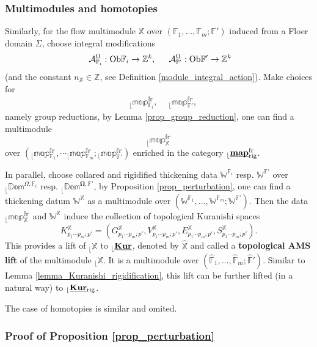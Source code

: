 \documentclass[reqno, 10pt]{amsart}
\numberwithin{equation}{section}
\numberwithin{equation}{section}
\theoremstyle{definition}
\theoremstyle{remark}
\newcommand{\beqn}{\begin{equation*}}
\newcommand{\eeqn}{\end{equation*}}
\newcommand{\mb}{\mathbb}
\newcommand{\mc}{\mathcal}
\renewcommand{\outer}{{}_{\lfloor}}
\newcommand{\wh}{\widehat}
\newcommand{\uds}[1]{\underline{\smash{#1}}}
\begin{document}
\subsubsection{Multimodules and homotopies}

Similarly, for the flow multimodule ${\mb X}$ over $({\mb F}_1, \ldots, {\mb F}_m; {\mb F}')$ induced from a Floer domain $\Sigma$, choose integral modifications 
\begin{align*}
&\ {\mc A}_{{\mb F}_i}^\Omega: {\rm Ob}{\mb F}_i \to {\mb Z}^k,\ &\ {\mc A}_{{\mb F}'}^\Omega: {\rm Ob}{\mb F}' \to {\mb Z}^k
\end{align*}
(and the constant $n_{\mb X}\in {\mb Z}$, see Definition \ref{module_integral_action}). Make choices for 
\begin{align*}
&\ \outer {\mb{map}}{}_{{\mb F}_i}^{\mb{fr}},\ &\ \outer {\mb{map}}{}_{{\mb{F}'}}^{\mb{fr}},
\end{align*}
namely group reductions, by Lemma \ref{prop_group_reduction}, one can find a multimodule
\beqn
\outer {\mb{map}}{}_{{\mb X}}^{\mb{fr}}
\eeqn
over $(\outer {\mb{map}}{}_{\mb{F}_1}^{\mb{fr}}, \cdots \outer {\mb{map}}{}_{{\mb F}_m}^{\mb{fr}}; \outer {\mb{map}}{}_{{\mb F}'}^{\mb{fr}})$ enriched in the category $\outer \uds{\bf map}{}_{\rm rig}^{\rm fr}$. 

In parallel, choose collared and rigidified  thickening data $\mb{W}^{{\mb F}_i}$ resp. $\mb{W}^{\mb{F}'}$ over $\outer \mb{Dom}^{\Omega, {\mb F}_i}$ resp. $\outer \mb{Dom}^{{\bm \Omega}, {\mb F}'}$, by Proposition \ref{prop_perturbation}, one can find a thickening datum ${\mb W}^{{\mb X}}$ as a multimodule over $(\mb{W}^{{\mb F}_1}, \ldots, \mb{W}^{{\mb F}_m}; \mb{W}^{\mb{F}'})$. Then the data $\outer {\mb{map}}{}_{\mb X}^{\mb{fr}}$ and $\mb{W}^{\mb X}$ induce the collection of topological Kuranishi spaces
\beqn
K_{p_1 \cdots p_m; p'}^{\mb X} = (G_{p_1 \cdots p_m; p'}^{\mb X}, V_{p_1 \cdots p_m; p'}^{\mb X}, E_{p_1 \cdots p_m; p'}^{\mb X}, S_{p_1 \cdots p_m; p'}^{\mb X}).
\eeqn
This provides a lift of $\outer {\mb X}$ to $\outer \uds{\bf Kur}$, denoted by $\wh{\mb X}$ and called a {\bf topological AMS lift} of the multimodule $\outer {\mb X}$. It is a multimodule over $(\wh {\mb F}_1, \ldots, \wh {\mb F}_m; \wh {\mb F}')$. Similar to Lemma \ref{lemma_Kuranishi_rigidification}, this lift can be further lifted (in a natural way) to $\outer \uds{\bf Kur}{}_{\rm rig}$. 

The case of homotopies is similar and omited. 



\subsubsection{Proof of Proposition \ref{prop_perturbation}}\label{subsubsection_perturbation}
\end{document}
